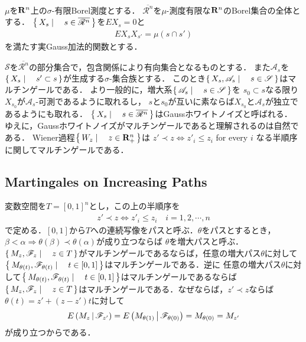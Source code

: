 	$\mu$を$\mathbf{R}^{n}$上の$\sigma$-有限Borel測度とする．
	$\overline{\mathscr{R}^{n}}$を$\mu$-測度有限な$\mathbf{R}^{n}$のBorel集合の全体とする．
	$\left\{\, X_{s} \mid \quad s \in \overline{\mathscr{R}^{n}}\, \right\}$を$EX_{s} = 0$と
	\begin{align}
		EX_{s}X_{s'} = \mu(s \cap s')
	\end{align}
	を満たす実Gauss加法的関数とする．
	
	$\mathscr{S}$を$\overline{\mathscr{R}^{n}}$の部分集合で，包含関係により有向集合となるものとする．
	また$\mathscr{A}_{s}$を$\left\{\, X_{s} \mid \quad s' \subset s\, \right\}$が生成する$\sigma$-集合族とする．
	このとき$\left\{\, X_{s},\mathscr{A}_{s} \mid \quad s \in \mathscr{S}\, \right\}$はマルチンゲールである．
	より一般的に，増大系$\left\{\, \mathscr{A}_{s} \mid \quad s \in \mathscr{S}\, \right\}$を
	$s_{0} \subset s$なる限り$X_{s_{0}}$が$\mathscr{A}_{s}$-可測であるように取れるし，
	$s$と$s_{0}$が互いに素ならば$X_{s_{0}}$と$\mathscr{A}_{s}$が独立であるようにも取れる．
	$\left\{\, X_{s} \mid \quad s \in \overline{\mathscr{R}^{n}}\, \right\}$はGaussホワイトノイズと呼ばれる．
	ゆえに，Gaussホワイトノイズがマルチンゲールであると理解されるのは自然である．
	Wiener過程$\left\{\, W_{z} \mid \quad z \in \mathbf{R}^{n}_{+}\, \right\}$は
	$z' \prec z \Longleftrightarrow z'_{i} \leq z_{i}$ for every $i$ なる半順序に関してマルチンゲールである．
	
\subsection{Martingales on Increasing Paths}
	変数空間を$T = [0,1]^{n}$とし，この上の半順序を
	\begin{align}
		z' \prec z \Longleftrightarrow z'_{i} \leq z_{i} \quad i=1,2,\cdots,n
	\end{align}
	で定める．$[0,1]$から$T$への連続写像をパスと呼ぶ．$\theta$をパスとするとき，
	$\beta < \alpha \Longrightarrow \theta(\beta) \prec \theta(\alpha)$が成り立つならば
	$\theta$を増大パスと呼ぶ．$\left\{\, M_{z},\mathscr{F}_{z} \mid \quad z \in T\, \right\}$がマルチンゲールであるならば，任意の増大パス$\theta$に対して
	$\left\{\, M_{\theta(t)},\mathscr{F}_{\theta(t)} \mid \quad t \in [0,1]\, \right\}$はマルチンゲールである．逆に
	任意の増大パス$\theta$に対して$\left\{\, M_{\theta(t)},\mathscr{F}_{\theta(t)} \mid \quad t \in [0,1]\, \right\}$はマルチンゲールであるならば
	$\left\{\, M_{z},\mathscr{F}_{z} \mid \quad z \in T\, \right\}$はマルチンゲールである．なぜならば，$z' \prec z$ならば
	$\theta(t) = z' + (z-z')t$に対して
	\begin{align}
		E\left( M_{z} \, \middle|\, \mathscr{F}_{z'} \right)
		= E\left( M_{\theta(1)} \, \middle|\, \mathscr{F}_{\theta(0)} \right)
		= M_{\theta(0)}
		= M_{z'}
	\end{align}
	が成り立つからである．
	
